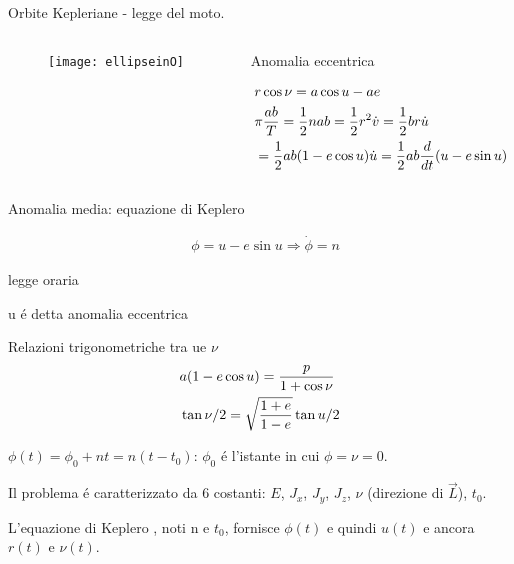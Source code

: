 \begin{frame}{Orbite Kepleriane - legge del moto.}

\begin{columns}

\begin{column}{0.2\textwidth}

\begin{figure}[!ht]

\texttt{[image: ellipseinO]}

\end{figure}



\end{column}

\begin{column}{0.8\textwidth}

\begin{block}{Anomalia eccentrica}

\begin{align*}
&r\cos{\nu}=a\cos{u}-ae\\
&\pi\frac{ab}{T}=\frac{1}{2}nab=\frac{1}{2}r^2\dot{v}=\frac{1}{2}br\dot{u}\\
&=\frac{1}{2}ab(1-e\cos{u})\dot{u}=\frac{1}{2}ab\frac{d}{d t}(u-e\sin{u})
\end{align*}

\end{block}

\end{column}

\end{columns}

\begin{block}{Anomalia media: equazione di Keplero}

\begin{align*}\label{eq:Keq}
&\phi=u-e\sin{u}\Rightarrow\dot{\phi}=n
\end{align*}


\end{block}


\end{frame}

\begin{wordonframe}{legge oraria}

u \'e detta anomalia eccentrica

Relazioni trigonometriche tra ue $\nu$
\begin{align*}
&a(1-e\cos{u})=\frac{p}{1+\cos{\nu}}\\
&\operatorname{tan}{\nu/2}=\sqrt{\frac{1+e}{1-e}}\operatorname{tan}{u/2}
\end{align*}

$\phi(t)=\phi_0+nt=n(t-t_0)$: $\phi_0$ \'e l'istante in cui $\phi=\nu=0$.

Il problema \'e caratterizzato da 6 costanti: $E$, $J_x$, $J_y$, $J_z$, $\nu$ (direzione di $\vec{L}$), $t_0$.

L'equazione di Keplero , noti n e $t_0$, fornisce $\phi(t)$ e quindi $u(t)$ e ancora $r(t)$ e $\nu(t)$.

\end{wordonframe}

